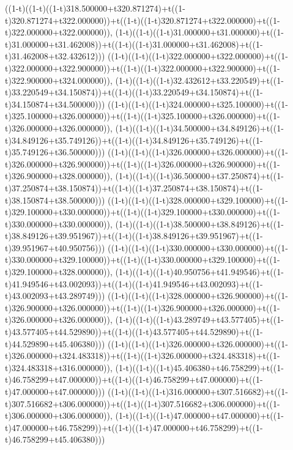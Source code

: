 ((1-t)((1-t)((1-t)318.500000+t320.871274)+t((1-t)320.871274+t322.000000))+t((1-t)((1-t)320.871274+t322.000000)+t((1-t)322.000000+t322.000000)),                                     (1-t)((1-t)((1-t)31.000000+t31.000000)+t((1-t)31.000000+t31.462008))+t((1-t)((1-t)31.000000+t31.462008)+t((1-t)31.462008+t32.432612)))
((1-t)((1-t)((1-t)322.000000+t322.000000)+t((1-t)322.000000+t322.900000))+t((1-t)((1-t)322.000000+t322.900000)+t((1-t)322.900000+t324.000000)),                                     (1-t)((1-t)((1-t)32.432612+t33.220549)+t((1-t)33.220549+t34.150874))+t((1-t)((1-t)33.220549+t34.150874)+t((1-t)34.150874+t34.500000)))
((1-t)((1-t)((1-t)324.000000+t325.100000)+t((1-t)325.100000+t326.000000))+t((1-t)((1-t)325.100000+t326.000000)+t((1-t)326.000000+t326.000000)),                                     (1-t)((1-t)((1-t)34.500000+t34.849126)+t((1-t)34.849126+t35.749126))+t((1-t)((1-t)34.849126+t35.749126)+t((1-t)35.749126+t36.500000)))
((1-t)((1-t)((1-t)326.000000+t326.000000)+t((1-t)326.000000+t326.900000))+t((1-t)((1-t)326.000000+t326.900000)+t((1-t)326.900000+t328.000000)),                                     (1-t)((1-t)((1-t)36.500000+t37.250874)+t((1-t)37.250874+t38.150874))+t((1-t)((1-t)37.250874+t38.150874)+t((1-t)38.150874+t38.500000)))
((1-t)((1-t)((1-t)328.000000+t329.100000)+t((1-t)329.100000+t330.000000))+t((1-t)((1-t)329.100000+t330.000000)+t((1-t)330.000000+t330.000000)),                                     (1-t)((1-t)((1-t)38.500000+t38.849126)+t((1-t)38.849126+t39.951967))+t((1-t)((1-t)38.849126+t39.951967)+t((1-t)39.951967+t40.950756)))
((1-t)((1-t)((1-t)330.000000+t330.000000)+t((1-t)330.000000+t329.100000))+t((1-t)((1-t)330.000000+t329.100000)+t((1-t)329.100000+t328.000000)),                                     (1-t)((1-t)((1-t)40.950756+t41.949546)+t((1-t)41.949546+t43.002093))+t((1-t)((1-t)41.949546+t43.002093)+t((1-t)43.002093+t43.289749)))
((1-t)((1-t)((1-t)328.000000+t326.900000)+t((1-t)326.900000+t326.000000))+t((1-t)((1-t)326.900000+t326.000000)+t((1-t)326.000000+t326.000000)),                                     (1-t)((1-t)((1-t)43.289749+t43.577405)+t((1-t)43.577405+t44.529890))+t((1-t)((1-t)43.577405+t44.529890)+t((1-t)44.529890+t45.406380)))
((1-t)((1-t)((1-t)326.000000+t326.000000)+t((1-t)326.000000+t324.483318))+t((1-t)((1-t)326.000000+t324.483318)+t((1-t)324.483318+t316.000000)),                                     (1-t)((1-t)((1-t)45.406380+t46.758299)+t((1-t)46.758299+t47.000000))+t((1-t)((1-t)46.758299+t47.000000)+t((1-t)47.000000+t47.000000)))
((1-t)((1-t)((1-t)316.000000+t307.516682)+t((1-t)307.516682+t306.000000))+t((1-t)((1-t)307.516682+t306.000000)+t((1-t)306.000000+t306.000000)),                                     (1-t)((1-t)((1-t)47.000000+t47.000000)+t((1-t)47.000000+t46.758299))+t((1-t)((1-t)47.000000+t46.758299)+t((1-t)46.758299+t45.406380)))
